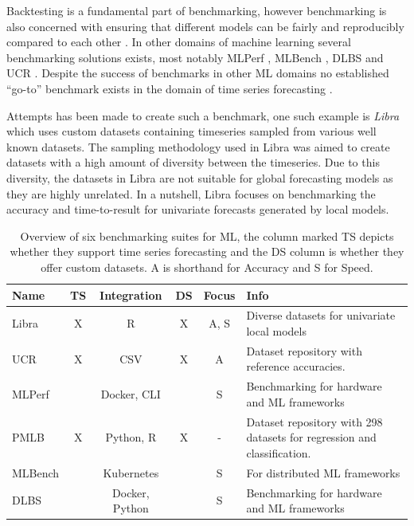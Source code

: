 Backtesting is a fundamental part of benchmarking, however benchmarking is also concerned with ensuring that different models can be fairly and reproducibly compared to each other \cite{huang_benchmarking_2019}. In other domains of machine learning several benchmarking solutions exists, most notably MLPerf \cite{mattson_mlperf_2020}, MLBench \cite{noauthor_mlbench_nodate}, DLBS \cite{vassilieva_deep_nodate} and UCR \cite{dau2019ucr}. Despite the success of benchmarks in other ML domains no established “go-to” benchmark exists in the domain of time series forecasting \cite{huang_benchmarking_2019}.

Attempts has been made to create such a benchmark, one such example is \textit{Libra} \cite{bauer2021libra} which uses custom datasets containing timeseries sampled from various well known datasets. The sampling methodology used in Libra was aimed to create datasets with a high amount of diversity between the timeseries. Due to this diversity, the datasets in Libra are not suitable for global forecasting models as they are highly unrelated. In a nutshell, Libra focuses on benchmarking the accuracy and time-to-result for univariate forecasts generated by local models.


\begin{table}[h]
  \begin{tabularx}{\textwidth}{|l|c|c|c|c|X|}
    \hline
    Name    & TS & Integration    & DS & Focus & Info                                                                    \\
    \hline
    \hline
    Libra   & X  & R              & X  & A, S  & Diverse datasets for univariate local models                            \\
    \hline
    UCR     & X  & CSV            & X  & A     & Dataset repository with reference accuracies.                           \\
    \hline
    MLPerf  &    & Docker, CLI    &    & S     & Benchmarking for hardware and ML frameworks                             \\
    \hline
    PMLB    & X  & Python, R      & X  & -     & Dataset repository with 298 datasets for regression and classification. \\
    \hline
    MLBench &    & Kubernetes     &    & S     & For distributed ML frameworks                                           \\
    \hline
    DLBS    &    & Docker, Python &    & S     & Benchmarking for hardware and ML frameworks                             \\
    \hline
  \end{tabularx}
  \caption{Overview of six benchmarking suites for ML, the column marked TS depicts whether they support time series forecasting and the DS column is whether they offer custom datasets. A is shorthand for  Accuracy and S for Speed.}
  \label{tab:benchmarking_suites}
\end{table}

